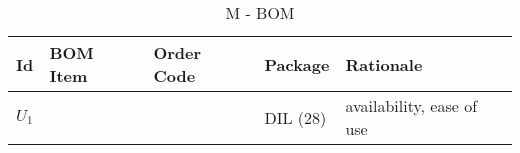 
\begin{table}[H]
    \centering
    \begin{tabularx}{\linewidth}{>{\hsize=0.25\hsize}X
            >{\hsize=1\hsize}X >{\hsize=1\hsize}X
            >{\hsize=0.5\hsize}X >{\hsize=2.25\hsize}X}
        Id    & BOM Item                       & Order Code & Package  & Rationale                 \\
        \midrule
        $U_1$ & \cite{noauthor_arduino_2016-1} &            & DIL (28) & availability, ease of use \\
    \end{tabularx}
    \caption{\mu M - BOM}

\end{table}